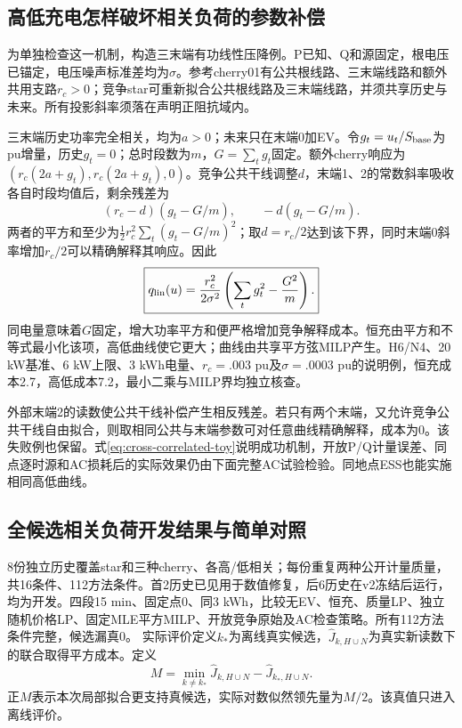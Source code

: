 \documentclass[UTF8,fontset=fandol,11pt,a4paper]{ctexart}
\begin{document}
\subsection{高低充电怎样破坏相关负荷的参数补偿}
为单独检查这一机制，构造三末端有功线性压降例。P已知、Q和源固定，根电压已锚定，电压噪声标准差均为$\sigma$。参考cherry01有公共根线路、三末端线路和额外共用支路$r_c>0$；竞争star可重新拟合公共根线路及三末端线路，并须共享历史与未来。所有投影斜率须落在声明正阻抗域内。

三末端历史功率完全相关，均为$a>0$；未来只在末端0加EV。令$g_t=u_t/S_{\rm base}$为pu增量，历史$g_t=0$；总时段数为$m$，$G=\sum_tg_t$固定。额外cherry响应为$(r_c(2a+g_t),r_c(2a+g_t),0)$。竞争公共干线调整$d$，末端1、2的常数斜率吸收各自时段均值后，剩余残差为
\[
 (r_c-d)(g_t-G/m),\qquad -d(g_t-G/m).
\]
两者的平方和至少为$\tfrac12r_c^2\sum_t(g_t-G/m)^2$；取$d=r_c/2$达到该下界，同时末端0斜率增加$r_c/2$可以精确解释其响应。因此
\begin{equation}
 \boxed{q_{\rm lin}(u)=\frac{r_c^2}{2\sigma^2}
 \left(\sum_tg_t^2-\frac{G^2}{m}\right).}
 \label{eq:cross-correlated-toy}
\end{equation}
同电量意味着$G$固定，增大功率平方和便严格增加竞争解释成本。恒充由平方和不等式最小化该项，高低曲线使它更大；曲线由共享平方弦MILP产生。H6/N4、20 kW基准、6 kW上限、3 kWh电量、$r_c=.003$ pu及$\sigma=.0003$ pu的说明例，恒充成本2.7，高低成本7.2，最小二乘与MILP界均独立核查。

外部末端2的读数使公共干线补偿产生相反残差。若只有两个末端，又允许竞争公共干线自由拟合，则取相同公共与末端参数可对任意曲线精确解释，成本为0。该失败例也保留。式\eqref{eq:cross-correlated-toy}说明成功机制，开放P/Q计量误差、同点逐时源和AC损耗后的实际效果仍由下面完整AC试验检验。同地点ESS也能实施相同高低曲线。
\subsection{全候选相关负荷开发结果与简单对照}
8份独立历史覆盖star和三种cherry、各高/低相关；每份重复两种公开计量质量，共16条件、112方法条件。首2历史已见用于数值修复，后6历史在v2冻结后运行，均为开发。四段15 min、固定点0、同3 kWh，比较无EV、恒充、质量LP、独立随机价格LP、固定MLE平方MILP、开放竞争原始及AC检查策略。所有112方法条件完整，候选漏真0。
实际评价定义$k_*$为离线真实候选，$\hat J_{k,H\cup N}$为真实新读数下的联合取得平方成本。定义
\[M=\min_{k\ne k_*}\hat J_{k,H\cup N}-\hat J_{k_*,H\cup N}.\]
正$M$表示本次局部拟合更支持真候选，实际对数似然领先量为$M/2$。该真值只进入离线评价。
\end{document}
